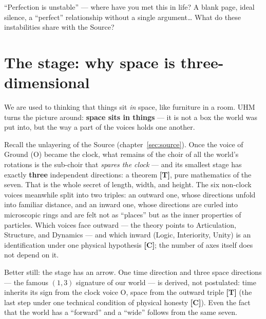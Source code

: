 \documentclass[11pt,letterpaper]{article}
\newcommand{\stT}{\textbf{[T]}\xspace}
\newcommand{\stC}{\textbf{[C]}\xspace}
\begin{document}
\begin{askbox}
``Perfection is unstable'' --- where have you met this in life? A
blank page, ideal silence, a ``perfect'' relationship without a
single argument\ldots{} What do these instabilities share with the
Source?
\end{askbox}

\section{The stage: why space is three-dimensional}
\label{sec:space}

We are used to thinking that things sit \emph{in} space, like
furniture in a room. UHM turns the picture around: \textbf{space sits
in things} --- it is not a box the world was put into, but the way a
part of the voices holds one another.

Recall the unlayering of the Source (chapter~\ref{sec:source}). Once
the voice of Ground (O) became the clock, what remains of the choir
of all the world's rotations is the sub-choir that \emph{spares the
clock} --- and its smallest stage has exactly \textbf{three}
independent directions: a theorem \stT, pure mathematics of the
seven. That is the whole secret of length, width, and height. The six
non-clock voices meanwhile split into two triples: an outward one,
whose directions unfold into familiar distance, and an inward one,
whose directions are curled into microscopic rings and are felt not
as ``places'' but as the inner properties of particles. Which voices
face outward --- the theory points to Articulation, Structure, and
Dynamics --- and which inward (Logic, Interiority, Unity) is an
identification under one physical hypothesis \stC; the number of
axes itself does not depend on it.

Better still: the stage has an arrow. One time direction and three
space directions --- the famous $(1{,}3)$ signature of our world ---
is derived, not postulated: time inherits its sign from the clock
voice O, space from the outward triple \stT{} (the last step under
one technical condition of physical honesty \stC). Even the fact
that the world has a ``forward'' and a ``wide'' follows from the
same seven.
\end{document}
